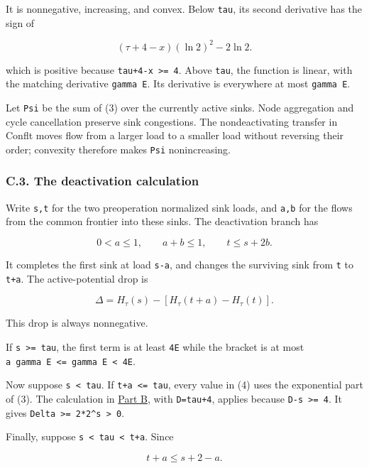 It is nonnegative, increasing, and convex. Below \texttt{tau}, its second derivative has the sign of

\[
(\tau+4-x)(\ln2)^2-2\ln2.
\]

which is positive because \texttt{tau+4-x\ \textgreater{}=\ 4}. Above \texttt{tau}, the function is linear, with the matching derivative \texttt{gamma\ E}. Its derivative is everywhere at most \texttt{gamma\ E}.

Let \texttt{Psi} be the sum of (3) over the currently active sinks. Node aggregation and cycle cancellation preserve sink congestions. The nondeactivating transfer in Conflt moves flow from a larger load to a smaller load without reversing their order; convexity therefore makes \texttt{Psi} nonincreasing.

\hypertarget{af-385fd70686-c.3.-the-deactivation-calculation}{%
\subsubsection{C.3. The deactivation calculation}\label{af-385fd70686-c.3.-the-deactivation-calculation}}

Write \texttt{s,t} for the two preoperation normalized sink loads, and \texttt{a,b} for the flows from the common frontier into these sinks. The deactivation branch has

\[
0<a\le1,\qquad a+b\le1,\qquad t\le s+2b.
\]

It completes the first sink at load \texttt{s-a}, and changes the surviving sink from \texttt{t} to \texttt{t+a}. The active-potential drop is

\[
\Delta=H_\tau(s)-[H_\tau(t+a)-H_\tau(t)].          \tag{4}
\]

This drop is always nonnegative.

If \texttt{s\ \textgreater{}=\ tau}, the first term is at least \texttt{4E} while the bracket is at most \texttt{a\ gamma\ E\ \textless{}=\ gamma\ E\ \textless{}\ 4E}.

Now suppose \texttt{s\ \textless{}\ tau}. If \texttt{t+a\ \textless{}=\ tau}, every value in (4) uses the exponential part of (3). The calculation in \protect\hyperlink{af-385fd70686-exponential-moment}{Part B}, with \texttt{D=tau+4}, applies because \texttt{D-s\ \textgreater{}=\ 4}. It gives \texttt{Delta\ \textgreater{}=\ 2*2\^{}s\ \textgreater{}\ 0}.

Finally, suppose \texttt{s\ \textless{}\ tau\ \textless{}\ t+a}. Since

\[
t+a\le s+2-a.
\]

